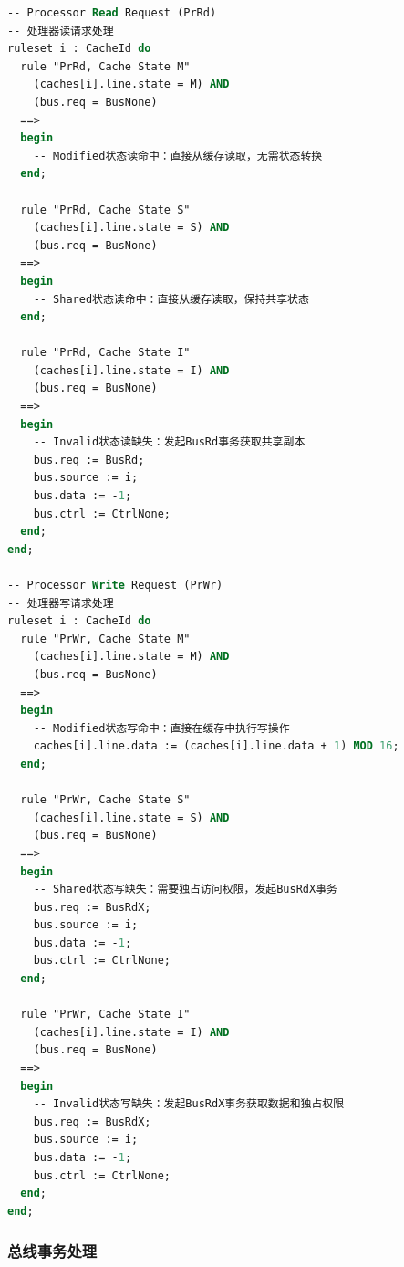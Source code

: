 \documentclass[a4paper]{article}
\begin{document}
\begin{lstlisting}[language=pascal]
-- Processor Read Request (PrRd)
-- 处理器读请求处理
ruleset i : CacheId do
  rule "PrRd, Cache State M"
    (caches[i].line.state = M) AND
    (bus.req = BusNone)
  ==>
  begin
    -- Modified状态读命中：直接从缓存读取，无需状态转换
  end;

  rule "PrRd, Cache State S"
    (caches[i].line.state = S) AND
    (bus.req = BusNone)
  ==>
  begin
    -- Shared状态读命中：直接从缓存读取，保持共享状态
  end;

  rule "PrRd, Cache State I"
    (caches[i].line.state = I) AND
    (bus.req = BusNone)
  ==>
  begin
    -- Invalid状态读缺失：发起BusRd事务获取共享副本
    bus.req := BusRd;
    bus.source := i;
    bus.data := -1;
    bus.ctrl := CtrlNone;
  end;
end;

-- Processor Write Request (PrWr)  
-- 处理器写请求处理
ruleset i : CacheId do
  rule "PrWr, Cache State M"
    (caches[i].line.state = M) AND
    (bus.req = BusNone)
  ==>
  begin
    -- Modified状态写命中：直接在缓存中执行写操作
    caches[i].line.data := (caches[i].line.data + 1) MOD 16;
  end;

  rule "PrWr, Cache State S"
    (caches[i].line.state = S) AND
    (bus.req = BusNone)
  ==>
  begin
    -- Shared状态写缺失：需要独占访问权限，发起BusRdX事务
    bus.req := BusRdX;
    bus.source := i;
    bus.data := -1;
    bus.ctrl := CtrlNone;
  end;

  rule "PrWr, Cache State I"
    (caches[i].line.state = I) AND
    (bus.req = BusNone)
  ==>
  begin
    -- Invalid状态写缺失：发起BusRdX事务获取数据和独占权限
    bus.req := BusRdX;
    bus.source := i;
    bus.data := -1;
    bus.ctrl := CtrlNone;
  end;
end;
\end{lstlisting}

\subsubsection{总线事务处理}
\end{document}
